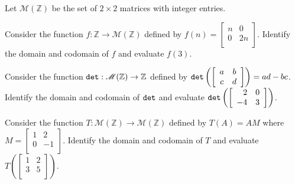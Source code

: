 \begin{exer}[\exerP] %
\label{exer_matrix_functions_easy}    
    Let $\mathscr{M}(\mathbb{Z})$ be the set of $2 \times 2$ matrices with integer entries.
    \begin{exerpart}
        \item Consider the function $f: \mathbb{Z} \to \mathscr{M}(\mathbb{Z})$ defined by $f(n) = \left[ \begin{array}{cc} n & 0 \\ 0 & 2n \\ \end{array} \right]$. Identify the domain and codomain of $f$ and evaluate $f(3)$.
        \item \label{part_det_fn} Consider the function $\texttt{det}: \mathscr{M}(\mathbb{Z}) \to \mathbb{Z}$ defined by $\texttt{det} \left( \left[ \begin{array}{cc} a & b \\ c & d \\ \end{array} \right] \right) = ad-bc$. Identify the domain and codomain of $\texttt{det}$ and evaluate $\texttt{det}\left( \left[ \begin{array}{rr} 2 & 0 \\ -4 & 3 \\ \end{array} \right] \right)$.
        \item Consider the function $T: \mathscr{M}(\mathbb{Z}) \to \mathscr{M}(\mathbb{Z})$ defined by $T(A) = AM$ where $M = \left[ \begin{array}{cr} 1 & 2 \\ 0 & -1 \\ \end{array} \right] $. Identify the domain and codomain of $T$ and evaluate $T\left( \left[ \begin{array}{cc} 1 & 2 \\ 3 & 5 \\ \end{array} \right] \right)$.
    \end{exerpart}
\end{exer}

